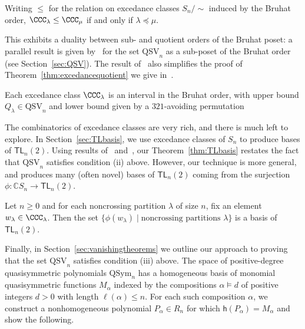 \documentclass[submission]{FPSAC2024}
\theoremstyle{definition}
\theoremstyle{remark}
\numberwithin{equation}{section}
\newenvironment{introthm}[1]{
  \renewcommand\theequation{#1}
  \thm
}{\endthm}
\newenvironment{introcor}[1]{
  \renewcommand\theequation{#1}
  \cor
}{\endcor}
\newcommand{\CC}{\mathbb{C}}
\newcommand{\TL}{\mathsf{TL}}
\newcommand{\QSym}{\mathrm{QSym}}
\newcommand{\QSV}{\mathrm{QSV}}
\begin{document}
\begin{introthm}{\ref{thm:excedancequotient}}
Writing $\le$ for the relation on excedance classes $S_{n}\big/\!\! \sim$ induced by the Bruhat order, $\CCC_{\lambda} \le \CCC_{\mu}$ if and only if $\lambda \preceq \mu$.
\end{introthm}

This exhibits a duality between sub- and quotient orders of the Bruhat poset: 
a parallel result is given by~\cite{GW16} for the set $\QSV_{n}$ as a sub-poset of the Bruhat order (see Section~\ref{sec:QSV}).  The result of~\cite{GW16} also simplifies the proof of Theorem~\ref{thm:excedancequotient} we give in~\cite{BG}.  

\begin{introcor}{\ref{cor:interval}}
Each excedance class $\CCC_{\lambda}$ is an interval in the Bruhat order, with upper bound $Q_{\lambda}\in \QSV_n$ and lower bound given by a $321$-avoiding permutation
\end{introcor}

The combinatorics of excedance classes are very rich, and there is much left to explore.   
In Section~\ref{sec:TLbasis}, we use excedance classes of $S_{n}$ to produce bases of $\TL_{n}(2)$.  Using results of~\cite{GW16} and~\cite{Z02}, our Theorem~\ref{thm:TLbasis} restates the fact that $\QSV_{n}$ satisfies condition (ii) above.  However, our technique is more general, and produces many (often novel) bases of $\TL_{n}(2)$ coming from the surjection $\phi: \CC S_{n} \to \TL_{n}(2)$.

\begin{introthm}{\ref{thm:TLbases}}
Let $n \ge 0$ and for each noncrossing partition $\lambda$ of size $n$, fix an element $w_{\lambda} \in \CCC_{\lambda}$. Then the set $\{\phi(w_{\lambda}) \;|\; \text{noncrossing partitions $\lambda$}\}$ is a basis of $\TL_{n}(2)$.
\end{introthm}

Finally, in Section~\ref{sec:vanishingtheorems} we outline our approach to proving that the set $\QSV_{n}$ satisfies condition (iii) above.  
The space of positive-degree quasisymmetric polynomials $\QSym_{n}$ has a homogeneous basis of monomial quasisymmetric functions $M_{\alpha}$ indexed by the compositions $\alpha \vDash d$ of positive integers $d > 0$ with length $\ell(\alpha) \le n$.  
For each such composition $\alpha$, we construct a nonhomogeneous polynomial $P_{\alpha} \in R_{n}$ for which $\mathsf{h}(P_{\alpha}) = M_{\alpha}$ and show the following.
\end{document}
